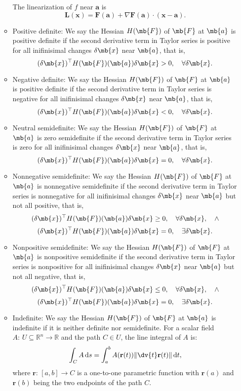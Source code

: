\documentclass[a4paper,12pt]{report}
\begin{document}
\begin{itemize}
\begin{itemize}
The linearization of $f$ near $\mathbf{a}$ is
\[\mathbf{L}(\mathbf{x})= \mathbf{F}(\mathbf{a}) + \nabla \mathbf{F}(\mathbf{a}) \cdot (\mathbf{x} - \mathbf{a}).\]
\bit
\item Positive definite: We say the Hessian $H(\mb{F})$ of $\mb{F}$ at $\mb{a}$ is positive definite if the second derivative term in Taylor series is positive for all inifinisimal changes $\delta\mb{x}$ near $\mb{a}$, that is,
\[(\delta\mb{x})^\top H(\mb{F})(\mb{a})\delta\mb{x}>0,\quad\forall \delta\mb{x}.\]
\item Negative definite: We say the Hessian $H(\mb{F})$ of $\mb{F}$ at $\mb{a}$ is positive definite if the second derivative term in Taylor series is negative for all inifinisimal changes $\delta\mb{x}$ near $\mb{a}$, that is,
\[(\delta\mb{x})^\top H(\mb{F})(\mb{a})\delta\mb{x}<0,\quad\forall \delta\mb{x}.\]
\item Neutral semidefinite: We say the Hessian $H(\mb{F})$ of $\mb{F}$ at $\mb{a}$ is zero semidefinite if the second derivative term in Taylor series is zero for all inifinisimal changes $\delta\mb{x}$ near $\mb{a}$, that is,
\[(\delta\mb{x})^\top H(\mb{F})(\mb{a})\delta\mb{x}=0,\quad\forall \delta\mb{x}.\]
\item Nonnegative semidefinite: We say the Hessian $H(\mb{F})$ of $\mb{F}$ at $\mb{a}$ is nonnegative semidefinite if the second derivative term in Taylor series is nonnegative for all inifinisimal changes $\delta\mb{x}$ near $\mb{a}$ but not all positive, that is,
\[(\delta\mb{x})^\top H(\mb{F})(\mb{a})\delta\mb{x}\geq 0,\quad\forall \delta\mb{x},\quad\land\]
\[(\delta\mb{x})^\top H(\mb{F})(\mb{a})\delta\mb{x}=0,\quad\exists \delta\mb{x}.\]
\item Nonpositive semidefinite: We say the Hessian $H(\mb{F})$ of $\mb{F}$ at $\mb{a}$ is nonpositive semidefinite if the second derivative term in Taylor series is nonpositive for all inifinisimal changes $\delta\mb{x}$ near $\mb{a}$ but not all negative, that is,
\[(\delta\mb{x})^\top H(\mb{F})(\mb{a})\delta\mb{x}\leq 0,\quad\forall \delta\mb{x},\quad\land\]
\[(\delta\mb{x})^\top H(\mb{F})(\mb{a})\delta\mb{x}=0,\quad\exists \delta\mb{x}.\]
\item Indefinite: We say the Hessian $H(\mb{F})$ of $\mb{F}$ at $\mb{a}$ is indefinite if it is neither definite nor semidefinite.
\eit
{}
For a scalar field $A : \,U\subseteq \mathbb {R} ^{n}\to \mathbb {R}$ and the path $C \in U$, the line integral of $A$ is: 
\[\int _{C}A\,\mathrm {d} s=\int _{a}^{b}A(\mathbf{r}(t))\|\dv{t}\mathbf {r} (t)\|\,\mathrm {d} t,\]
where $\mathbf{r}:\, [a, b] \to C$ is a one-to-one parametric function with $\mathbf{r}(a)$ and $\mathbf{r}(b)$ being the two endpoints of the path $C$. 


\end{itemize}
\end{itemize}
\end{document}

